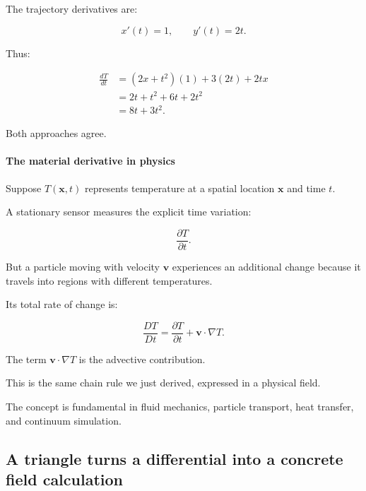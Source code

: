 The trajectory derivatives are:

\[
x'(t)=1,\qquad y'(t)=2t.
\]

Thus:

\[
\begin{aligned} \frac{dT}{dt} &=(2x+t^2)(1)+3(2t)+2tx\\ &=2t+t^2+6t+2t^2\\ &=\boxed{8t+3t^2}. \end{aligned}
\]

Both approaches agree.

\paragraph{The material derivative in physics}\label{02-foundations-ii-ch021-the-material-derivative-in-physics}

\hypertarget{02-foundations-ii-ch021-the-material-derivative-in-physics}{}

Suppose \(T(\mathbf x,t)\) represents temperature at a spatial location \(\mathbf x\) and time \(t\).

A stationary sensor measures the explicit time variation:

\[
\frac{\partial T}{\partial t}.
\]

But a particle moving with velocity \(\mathbf v\) experiences an additional change because it travels into regions with different temperatures.

Its total rate of change is:

\[
\boxed{ \frac{DT}{Dt} = \frac{\partial T}{\partial t} + \mathbf v\cdot\nabla T }.
\]

The term \(\mathbf v\cdot\nabla T\) is the advective contribution.

This is the same chain rule we just derived, expressed in a physical field.

The concept is fundamental in fluid mechanics, particle transport, heat transfer, and continuum simulation.

\subsection{A triangle turns a differential into a concrete field calculation}\label{02-foundations-ii-ch021-a-triangle-turns-a-differential-into-a-concrete-field-calculation}

\hypertarget{02-foundations-ii-ch021-a-triangle-turns-a-differential-into-a-concrete-field-calculation}{}

